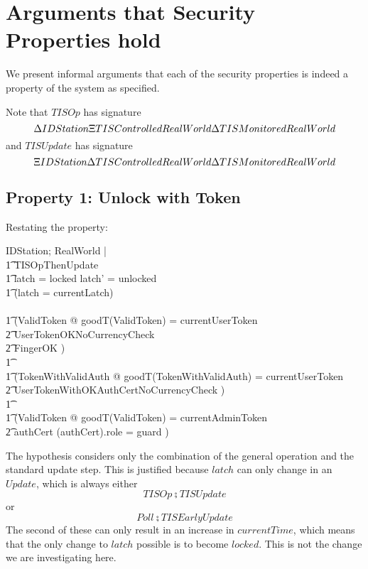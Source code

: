 \section{Arguments that Security Properties hold}
\label{sec:Arg}
We present informal arguments that each of the security properties is indeed a property
of the system as specified.


Note that $TISOp$ has signature
\[
	\Delta IDStation
\\	\Xi TISControlledRealWorld
\\	\Delta TISMonitoredRealWorld
\]
and $TISUpdate$ has signature
\[
	\Xi IDStation
\\	\Delta TISControlledRealWorld
\\	\Delta TISMonitoredRealWorld
\]
	
\subsection{Property 1: Unlock with Token}
\label{sec:UnlockArg}
Restating the property:

\begin{zed}
\Delta IDStation; \Delta RealWorld |
\\ \t1	TISOpThenUpdate
\\ \t1	\land latch = locked \land latch' = unlocked
\\ \t1	\land (latch = currentLatch)
\\ \shows
\\ \t1	(\exists ValidToken @
			goodT(\theta ValidToken) = currentUserToken
\\ \t2		\land UserTokenOKNoCurrencyCheck
\\ \t2		\land FingerOK
		)
\\ \t1	\lor
\\ \t1	(\exists TokenWithValidAuth @
			goodT(\theta TokenWithValidAuth) = currentUserToken
\\ \t2		\land UserTokenWithOKAuthCertNoCurrencyCheck
		)
\\ \t1 	\lor
\\ \t1  	(\exists ValidToken @
			goodT(\theta ValidToken) = currentAdminToken
\\ \t2			\land authCert \neq \emptyset 
				\land (\The authCert).role = guard
		)
\end{zed}
The hypothesis considers only the combination of the general operation and
the standard update step.
This is justified because $latch$ can only change in an $Update$,
which is always either
\[
	TISOp \semi TISUpdate
\]
or
\[
	Poll \semi TISEarlyUpdate
\]
The second of these can only result in an increase in $currentTime$,
which means that the only change to $latch$ possible is to become $locked$.
This is not the change we are investigating here.


